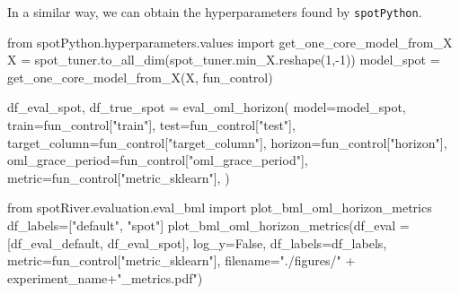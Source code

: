 \documentclass[
  letterpaper,
  DIV=11,
  numbers=noendperiod]{scrreprt}
\newenvironment{Shaded}{\begin{snugshade}}{\end{snugshade}}
\newcommand{\DecValTok}[1]{\textcolor[rgb]{0.68,0.00,0.00}{#1}}
\newcommand{\ImportTok}[1]{\textcolor[rgb]{0.00,0.46,0.62}{#1}}
\newcommand{\NormalTok}[1]{\textcolor[rgb]{0.00,0.23,0.31}{#1}}
\newcommand{\OperatorTok}[1]{\textcolor[rgb]{0.37,0.37,0.37}{#1}}
\newcommand{\StringTok}[1]{\textcolor[rgb]{0.13,0.47,0.30}{#1}}
\newcommand{\VariableTok}[1]{\textcolor[rgb]{0.07,0.07,0.07}{#1}}
\begin{document}
In a similar way, we can obtain the hyperparameters found by
\texttt{spotPython}.

\begin{Shaded}
\begin{Highlighting}[]
\ImportTok{from}\NormalTok{ spotPython.hyperparameters.values }\ImportTok{import}\NormalTok{ get\_one\_core\_model\_from\_X}
\NormalTok{X }\OperatorTok{=}\NormalTok{ spot\_tuner.to\_all\_dim(spot\_tuner.min\_X.reshape(}\DecValTok{1}\NormalTok{,}\OperatorTok{{-}}\DecValTok{1}\NormalTok{))}
\NormalTok{model\_spot }\OperatorTok{=}\NormalTok{ get\_one\_core\_model\_from\_X(X, fun\_control)}
\end{Highlighting}
\end{Shaded}

\begin{Shaded}
\begin{Highlighting}[]
\NormalTok{df\_eval\_spot, df\_true\_spot }\OperatorTok{=}\NormalTok{ eval\_oml\_horizon(}
\NormalTok{                    model}\OperatorTok{=}\NormalTok{model\_spot,}
\NormalTok{                    train}\OperatorTok{=}\NormalTok{fun\_control[}\StringTok{"train"}\NormalTok{],}
\NormalTok{                    test}\OperatorTok{=}\NormalTok{fun\_control[}\StringTok{"test"}\NormalTok{],}
\NormalTok{                    target\_column}\OperatorTok{=}\NormalTok{fun\_control[}\StringTok{"target\_column"}\NormalTok{],}
\NormalTok{                    horizon}\OperatorTok{=}\NormalTok{fun\_control[}\StringTok{"horizon"}\NormalTok{],}
\NormalTok{                    oml\_grace\_period}\OperatorTok{=}\NormalTok{fun\_control[}\StringTok{"oml\_grace\_period"}\NormalTok{],}
\NormalTok{                    metric}\OperatorTok{=}\NormalTok{fun\_control[}\StringTok{"metric\_sklearn"}\NormalTok{],}
\NormalTok{                )}
\end{Highlighting}
\end{Shaded}

\begin{Shaded}
\begin{Highlighting}[]
\ImportTok{from}\NormalTok{ spotRiver.evaluation.eval\_bml }\ImportTok{import}\NormalTok{ plot\_bml\_oml\_horizon\_metrics}
\NormalTok{df\_labels}\OperatorTok{=}\NormalTok{[}\StringTok{"default"}\NormalTok{, }\StringTok{"spot"}\NormalTok{]}
\NormalTok{plot\_bml\_oml\_horizon\_metrics(df\_eval }\OperatorTok{=}\NormalTok{ [df\_eval\_default, df\_eval\_spot], log\_y}\OperatorTok{=}\VariableTok{False}\NormalTok{, df\_labels}\OperatorTok{=}\NormalTok{df\_labels, metric}\OperatorTok{=}\NormalTok{fun\_control[}\StringTok{"metric\_sklearn"}\NormalTok{], filename}\OperatorTok{=}\StringTok{"./figures/"} \OperatorTok{+}\NormalTok{ experiment\_name}\OperatorTok{+}\StringTok{"\_metrics.pdf"}\NormalTok{)}
\end{Highlighting}
\end{Shaded}
\end{document}
